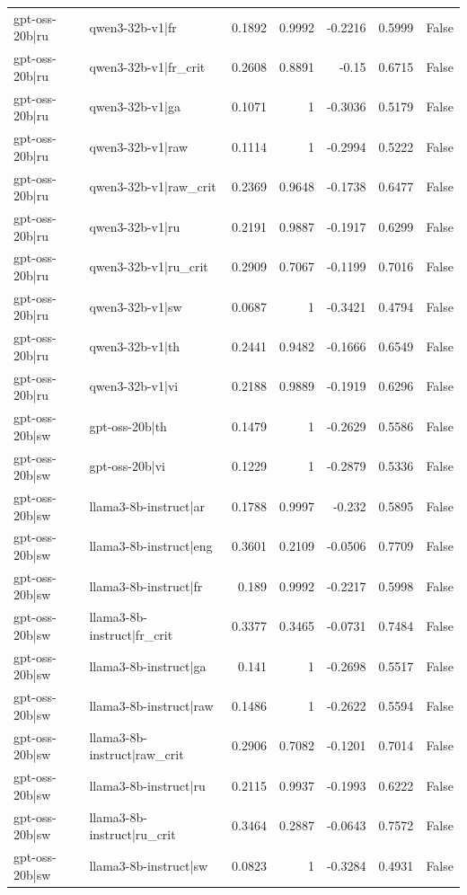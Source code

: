 \begin{table}
\begin{tabular}{l l r r r r l}
gpt-oss-20b|ru & qwen3-32b-v1|fr & 0.1892 & 0.9992 & -0.2216 & 0.5999 & False \\
gpt-oss-20b|ru & qwen3-32b-v1|fr_crit & 0.2608 & 0.8891 & -0.15 & 0.6715 & False \\
gpt-oss-20b|ru & qwen3-32b-v1|ga & 0.1071 & 1 & -0.3036 & 0.5179 & False \\
gpt-oss-20b|ru & qwen3-32b-v1|raw & 0.1114 & 1 & -0.2994 & 0.5222 & False \\
gpt-oss-20b|ru & qwen3-32b-v1|raw_crit & 0.2369 & 0.9648 & -0.1738 & 0.6477 & False \\
gpt-oss-20b|ru & qwen3-32b-v1|ru & 0.2191 & 0.9887 & -0.1917 & 0.6299 & False \\
gpt-oss-20b|ru & qwen3-32b-v1|ru_crit & 0.2909 & 0.7067 & -0.1199 & 0.7016 & False \\
gpt-oss-20b|ru & qwen3-32b-v1|sw & 0.0687 & 1 & -0.3421 & 0.4794 & False \\
gpt-oss-20b|ru & qwen3-32b-v1|th & 0.2441 & 0.9482 & -0.1666 & 0.6549 & False \\
gpt-oss-20b|ru & qwen3-32b-v1|vi & 0.2188 & 0.9889 & -0.1919 & 0.6296 & False \\
gpt-oss-20b|sw & gpt-oss-20b|th & 0.1479 & 1 & -0.2629 & 0.5586 & False \\
gpt-oss-20b|sw & gpt-oss-20b|vi & 0.1229 & 1 & -0.2879 & 0.5336 & False \\
gpt-oss-20b|sw & llama3-8b-instruct|ar & 0.1788 & 0.9997 & -0.232 & 0.5895 & False \\
gpt-oss-20b|sw & llama3-8b-instruct|eng & 0.3601 & 0.2109 & -0.0506 & 0.7709 & False \\
gpt-oss-20b|sw & llama3-8b-instruct|fr & 0.189 & 0.9992 & -0.2217 & 0.5998 & False \\
gpt-oss-20b|sw & llama3-8b-instruct|fr_crit & 0.3377 & 0.3465 & -0.0731 & 0.7484 & False \\
gpt-oss-20b|sw & llama3-8b-instruct|ga & 0.141 & 1 & -0.2698 & 0.5517 & False \\
gpt-oss-20b|sw & llama3-8b-instruct|raw & 0.1486 & 1 & -0.2622 & 0.5594 & False \\
gpt-oss-20b|sw & llama3-8b-instruct|raw_crit & 0.2906 & 0.7082 & -0.1201 & 0.7014 & False \\
gpt-oss-20b|sw & llama3-8b-instruct|ru & 0.2115 & 0.9937 & -0.1993 & 0.6222 & False \\
gpt-oss-20b|sw & llama3-8b-instruct|ru_crit & 0.3464 & 0.2887 & -0.0643 & 0.7572 & False \\
gpt-oss-20b|sw & llama3-8b-instruct|sw & 0.0823 & 1 & -0.3284 & 0.4931 & False \\

\end{tabular}
\end{table}
